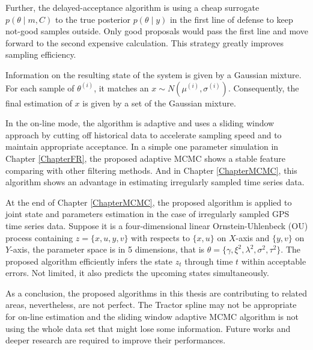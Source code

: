 Further, the delayed-acceptance algorithm is using a cheap surrogate $p(\theta\mid m, C)$ to the true posterior $p(\theta\mid y)$ in the first line of defense to keep not-good samples outside. Only good proposals would pass the first line and move forward to the second expensive calculation. This strategy greatly improves sampling efficiency. 

Information on the resulting state of the system is given by a Gaussian mixture. For each sample of $\theta^{(i)}$, it matches an $x \sim N(\mu^{(i)},\sigma^{(i)})$. Consequently, the final estimation of $x$ is given by a set of the Gaussian mixture. 

In the on-line mode, the algorithm is adaptive and uses a sliding window approach by cutting off historical data to accelerate sampling speed and to maintain appropriate acceptance. In a simple one parameter simulation in Chapter \ref{ChapterFR}, the proposed adaptive MCMC shows a stable feature comparing with other filtering methods. And in Chapter \ref{ChapterMCMC}, this algorithm shows an advantage in estimating irregularly sampled time series data. 

At the end of Chapter \ref{ChapterMCMC}, the proposed algorithm is applied to joint state and parameters estimation in the case of irregularly sampled GPS time series data. Suppose it is a four-dimensional linear Ornstein-Uhlenbeck (OU) process containing $z=\{x,u,y,v\}$ with respects to $\{x,u\}$ on $X$-axis and $\{y,v\}$ on $Y$-axis, the parameter space is in 5 dimensions, that is $\theta=\{\gamma,\xi^2,\lambda^2,\sigma^2,\tau^2\}$. The proposed algorithm efficiently infers the state $z_t$ through time $t$ within acceptable errors. Not limited, it also predicts the upcoming states simultaneously. 

As a conclusion, the proposed algorithms in this thesis are contributing to related areas, nevertheless, are not perfect. The Tractor spline may not be appropriate for on-line estimation and the sliding window adaptive MCMC algorithm is not using the whole data set that might lose some information. Future works and deeper research are required to improve their performances. 
